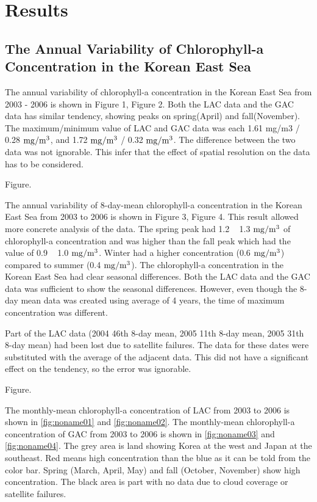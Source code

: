 
\section{Results}
 
\subsection{The Annual Variability of Chlorophyll-a Concentration in the Korean East Sea}
 
The annual variability of chlorophyll-a concentration in the Korean East Sea from 2003 - 2006 is shown in Figure 1, Figure 2. Both the LAC data and the GAC data has similar tendency, showing peaks on spring(April) and fall(November). The maximum/minimum value of LAC and GAC data was each 1.61 mg/m3 / 0.28 $\rm mg/m^3$, and 1.72 $\rm mg/m^3$ / 0.32 $\rm mg/m^3$. The difference between the two data was not ignorable. This infer that the effect of spatial resolution on the data has to be considered.
  
 Figure.
 
The annual variability of 8-day-mean chlorophyll-a concentration in the Korean East Sea from 2003 to 2006 is shown in Figure 3, Figure 4. This result allowed more concrete analysis of the data. The spring peak had 1.2 ~ 1.3 $\rm mg/m^3$ of chlorophyll-a concentration and was higher than the fall peak which had the value of 0.9 ~ 1.0 $\rm mg/m^3$. Winter had a higher concentration (0.6 $\rm mg/m^3$) compared to summer (0.4 $\rm mg/m^3$). The chlorophyll-a concentration in the Korean East Sea had clear seasonal differences. Both the LAC data and the GAC data was sufficient to show the seasonal differences. However, even though the 8-day mean data was created using average of 4 years, the time of maximum concentration was different. 

Part of the LAC data (2004 46th 8-day mean, 2005 11th 8-day mean, 2005 31th 8-day mean) had been lost due to satellite failures. The data for these dates were substituted with the average of the adjacent data. This did not have a significant effect on the tendency, so the error was ignorable.
  
  Figure.
 
The monthly-mean chlorophyll-a concentration of LAC from 2003 to 2006 is shown in \ref{fig:noname01} and \ref{fig:noname02}. The monthly-mean chlorophyll-a concentration of GAC from 2003 to 2006 is shown in \ref{fig:noname03} and \ref{fig:noname04}. The grey area is land showing Korea at the west and Japan at the southeast. Red means high concentration than the blue as it can be told from the color bar. Spring (March, April, May) and fall (October, November) show high concentration. The black area is part with no data due to cloud coverage or satellite failures. 
    
